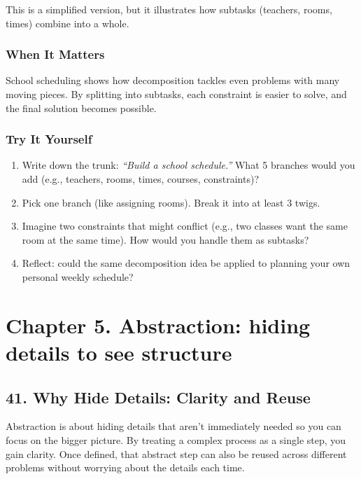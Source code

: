 \documentclass[
  letterpaper,
  DIV=11,
  numbers=noendperiod]{scrreprt}
\providecommand{\tightlist}{%
  \setlength{\itemsep}{0pt}\setlength{\parskip}{0pt}}
\begin{document}
This is a simplified version, but it illustrates how subtasks (teachers,
rooms, times) combine into a whole.

\subsubsection{When It Matters}\label{when-it-matters-37}

School scheduling shows how decomposition tackles even problems with
many moving pieces. By splitting into subtasks, each constraint is
easier to solve, and the final solution becomes possible.

\subsubsection{Try It Yourself}\label{try-it-yourself-39}

\begin{enumerate}
\def\labelenumi{\arabic{enumi}.}
\tightlist
\item
  Write down the trunk: \emph{``Build a school schedule.''} What 5
  branches would you add (e.g., teachers, rooms, times, courses,
  constraints)?
\item
  Pick one branch (like assigning rooms). Break it into at least 3
  twigs.
\item
  Imagine two constraints that might conflict (e.g., two classes want
  the same room at the same time). How would you handle them as
  subtasks?
\item
  Reflect: could the same decomposition idea be applied to planning your
  own personal weekly schedule?
\end{enumerate}

\section{Chapter 5. Abstraction: hiding details to see
structure}\label{chapter-5.-abstraction-hiding-details-to-see-structure}

\subsection{41. Why Hide Details: Clarity and
Reuse}\label{why-hide-details-clarity-and-reuse}

Abstraction is about hiding details that aren't immediately needed so
you can focus on the bigger picture. By treating a complex process as a
single step, you gain clarity. Once defined, that abstract step can also
be reused across different problems without worrying about the details
each time.
\end{document}
